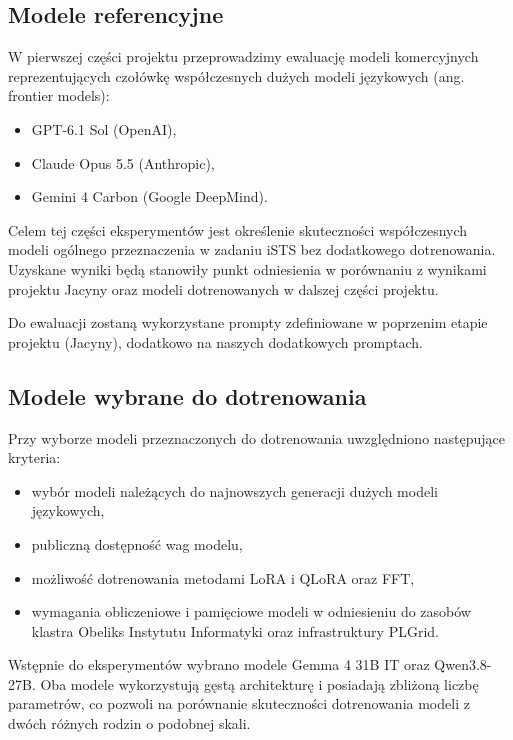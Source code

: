 \documentclass[a4paper,10pt]{article}
\begin{document}
\subsection{Modele referencyjne}

W pierwszej części projektu przeprowadzimy ewaluację
modeli komercyjnych reprezentujących czołówkę współczesnych
dużych modeli językowych (ang. frontier models):

\begin{itemize}
    \item GPT-6.1 Sol (OpenAI),
    \item Claude Opus 5.5 (Anthropic),
    \item Gemini 4 Carbon (Google DeepMind).
\end{itemize}

Celem tej części eksperymentów jest określenie skuteczności
współczesnych modeli ogólnego przeznaczenia w zadaniu iSTS
bez dodatkowego dotrenowania. Uzyskane wyniki będą stanowiły
punkt odniesienia w porównaniu z wynikami projektu Jacyny
oraz modeli dotrenowanych w dalszej części projektu.

Do ewaluacji zostaną wykorzystane prompty zdefiniowane w poprzenim etapie projektu (Jacyny), dodatkowo na naszych dodatkowych promptach.

\subsection{Modele wybrane do dotrenowania}

Przy wyborze modeli przeznaczonych do dotrenowania
uwzględniono następujące kryteria:

\begin{itemize}
    \item wybór modeli należących do najnowszych generacji
    dużych modeli językowych,
    \item publiczną dostępność wag modelu,
    \item możliwość dotrenowania metodami LoRA i QLoRA oraz FFT,
    \item wymagania obliczeniowe i pamięciowe modeli
    w odniesieniu do zasobów klastra Obeliks Instytutu
    Informatyki oraz
    infrastruktury PLGrid.
\end{itemize}

Wstępnie do eksperymentów wybrano modele Gemma 4 31B IT
oraz Qwen3.8-27B. Oba modele wykorzystują gęstą
architekturę i posiadają zbliżoną liczbę parametrów,
co pozwoli na porównanie skuteczności dotrenowania
modeli z dwóch różnych rodzin o podobnej skali.
\end{document}
